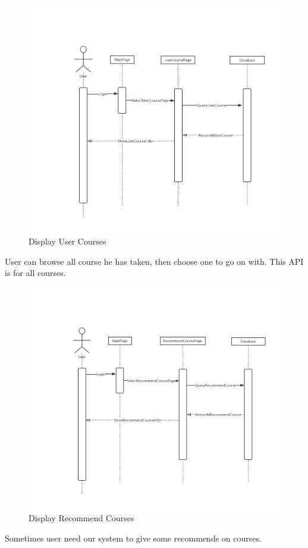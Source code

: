 \documentclass[16pt]{scrreprt}
\begin{document}
\begin{figure}[H]
    \includegraphics[width=\linewidth]{./FuncPhoto/7.png}   
    \caption{Display User Courses}
\end{figure}
User can browse all course he has taken, then choose one to go on with. This API is for all courses. 

\begin{figure}[H]
    \includegraphics[width=\linewidth]{./FuncPhoto/8.png}   
    \caption{Display Recommend Courses}
\end{figure}
Sometimes user need our system to give some recommends on courses.
\end{document}
